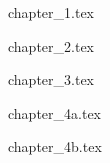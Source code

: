 \documentclass[10pt]{extarticle}
\begin{document}
  \begin{multicols}{2}

    {chapter_1.tex}
    \newpage

    {chapter_2.tex}
    \newpage

    {chapter_3.tex}
    \newpage

    {chapter_4a.tex}
    \newpage

    {chapter_4b.tex}
    \newpage

    \newpage

    \newpage

    \newpage

    \newpage


  \end{multicols}
\end{document}
